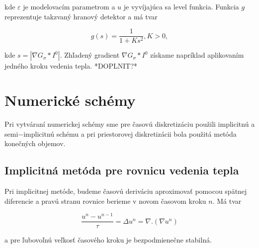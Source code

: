 \documentclass[a4paper,11pt,oneside]{article}%
\def\epsilon{\varepsilon}
\begin{document}
kde $\epsilon$ je modelovacím parametrom a $u$ je vyvíjajúca sa level funkcia. Funkcia $g$ reprezentuje takzvaný hranový detektor a má tvar

\begin{equation}
g(s) = \frac{1}{1+Ks^2}, K > 0,
\end{equation}

kde $s = |\nabla G_\sigma*I^0|$. Zhľadený gradient $\nabla G_\sigma*I^0$ získame napríklad aplikovaním jedného kroku vedenia tepla. *DOPLNIT?*




\newpage
\section{Numerické schémy}

Pri vytváraní numerickej schémy sme pre časovú diskretizáciu použili implicitnú a semi$-$implicitnú schému a pri priestorovej diskretizácii bola použitá metóda konečných objemov.



\subsection{Implicitná metóda pre rovnicu vedenia tepla}

Pri implicitnej metóde, budeme časovú deriváciu aproximovať pomocou spätnej diferencie a pravú stranu rovnice berieme v novom časovom kroku $n$. Má tvar

\begin{equation} \label{eq:ihe}
\frac{u^n - u^{n-1}}{\tau} = \Delta u^n = \nabla . (\nabla u^n)
\end{equation}

a pre ľubovoľnú veľkosť časového kroku je bezpodmienečne stabilná. 
\end{document}
